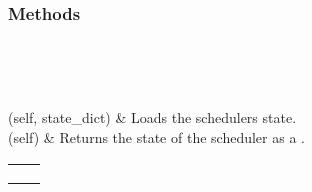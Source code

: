 \documentclass[letterpaper,10pt,english]{sphinxmanual}
\begin{document}
\begin{fulllineitems}
\subsubsection*{Methods}


\begin{savenotes}\sphinxatlongtablestart\begin{longtable}{}
\hline

\endfirsthead

%
{}\\
\hline

\endhead

\hline
{}\\
\endfoot

\endlastfoot

(self, state\_dict)
&
Loads the schedulers state.
\\
\hline
{}(self)
&
Returns the state of the scheduler as a .
\\
\hline
\end{longtable}\sphinxatlongtableend\end{savenotes}


\begin{savenotes}\sphinxattablestart
\centering
\begin{tabulary}{\linewidth}[t]{|T|T|}
\hline

&\\
\hline
{}
&\\
\hline
{}
&\\
\hline
{}
&\\
\hline
\end{tabulary}
\par
\sphinxattableend\end{savenotes}

\end{fulllineitems}

\end{document}
